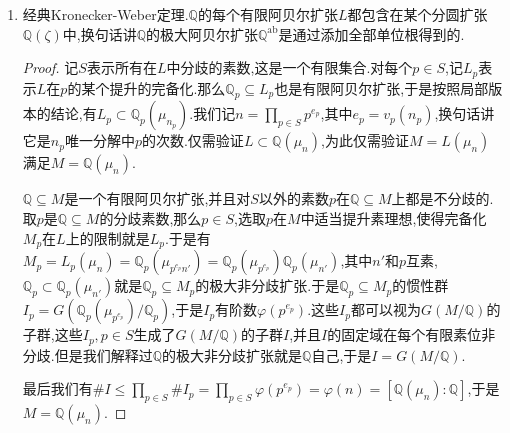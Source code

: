 \begin{enumerate}
\begin{proof}
    	我们先解释$(p^f)\times U_{\mathbb{Q}_p}$对应的类域就是$\mathbb{Q}_p(\mu_{p^f-1})$.这实际上是一个$f$次非分歧扩张.【?】
    	
    	接下来任取有限阿贝尔扩张$L$,那么可选取$f$和不被$p$整除的$n$使得$(p^f)\times U_{\mathbb{Q}_p}^{(n)}\subset\mathrm{N}_{L/K}L^*$.而这里$(p^f)\times U_{\mathbb{Q}_p}^((n))=((p^f)\times U_{\mathbb{Q}_p})\cap((p)\times U_{\mathbb{Q}_p}^{(n)})$.按照阿贝尔扩张和范群的对应,这两个相交的群分别对应于扩张$\mathbb{Q}_p(\mu_{p^n})$和$\mathbb{Q}_p(\mu_{p^f-1})$,于是交对应的扩张是这两个扩张的合成,也即$\mathbb{Q}_p(\mu_{p^n(p^f-1)})$,并且$L$是包含于这个分圆扩张.
    \end{proof}
    \item 经典Kronecker-Weber定理.$\mathbb{Q}$的每个有限阿贝尔扩张$L$都包含在某个分圆扩张$\mathbb{Q}(\zeta)$中,换句话讲$\mathbb{Q}$的极大阿贝尔扩张$\mathbb{Q}^{\mathrm{ab}}$是通过添加全部单位根得到的.
    \begin{proof}
    	
    	记$S$表示所有在$L$中分歧的素数,这是一个有限集合.对每个$p\in S$,记$L_p$表示$L$在$p$的某个提升的完备化.那么$\mathbb{Q}_p\subseteq L_p$也是有限阿贝尔扩张,于是按照局部版本的结论,有$L_p\subset\mathbb{Q}_p(\mu_{n_p})$.我们记$n=\prod_{p\in S}p^{e_p}$,其中$e_p=v_p(n_p)$,换句话讲它是$n_p$唯一分解中$p$的次数.仅需验证$L\subset\mathbb{Q}(\mu_n)$,为此仅需验证$M=L(\mu_n)$满足$M=\mathbb{Q}(\mu_n)$.
    	
    	$\mathbb{Q}\subseteq M$是一个有限阿贝尔扩张,并且对$S$以外的素数$p$在$\mathbb{Q}\subseteq M$上都是不分歧的.取$p$是$\mathbb{Q}\subseteq M$的分歧素数,那么$p\in S$,选取$p$在$M$中适当提升素理想,使得完备化$M_p$在$L$上的限制就是$L_p$.于是有$M_p=L_p(\mu_n)=\mathbb{Q}_p(\mu_{p^{e_p}n'})=\mathbb{Q}_p(\mu_{p^{e_p}})\mathbb{Q}_p(\mu_{n'})$,其中$n'$和$p$互素,$\mathbb{Q}_p\subset\mathbb{Q}_p(\mu_{n'})$就是$\mathbb{Q}_p\subseteq M_p$的极大非分歧扩张.于是$\mathbb{Q}_p\subseteq M_p$的惯性群$I_p=G(\mathbb{Q}_p(\mu_{p^{e_p}})/\mathbb{Q}_p)$,于是$I_p$有阶数$\varphi(p^{e_p})$.这些$I_p$都可以视为$G(M/\mathbb{Q})$的子群,这些$I_p,p\in S$生成了$G(M/\mathbb{Q})$的子群$I$,并且$I$的固定域在每个有限素位非分歧.但是我们解释过$\mathbb{Q}$的极大非分歧扩张就是$\mathbb{Q}$自己,于是$I=G(M/\mathbb{Q})$.
    	
    	最后我们有$\#I\le\prod_{p\in S}\#I_p=\prod_{p\in S}\varphi(p^{e_p})=\varphi(n)=[\mathbb{Q}(\mu_n):\mathbb{Q}]$,于是$M=\mathbb{Q}(\mu_n)$.
    \end{proof}
\end{enumerate}

